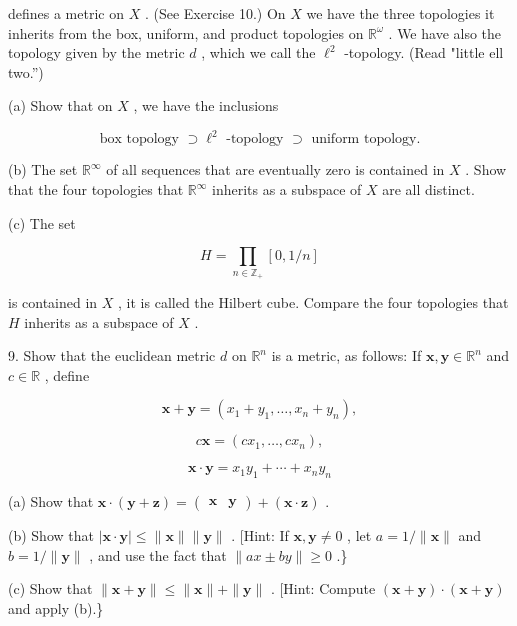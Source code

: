 defines a metric on \(X\) . (See Exercise 10.) On \(X\) we have the three topologies it inherits from the box, uniform, and product topologies on \({\mathbb{R}}^{\omega }\) . We have also the topology given by the metric \(d\) , which we call the \({\ell }^{2}\) -topology. (Read "little ell two.”)

(a) Show that on \(X\) , we have the inclusions

\[
\text{ box topology } \supset  {\ell }^{2}\text{ -topology } \supset  \text{ uniform topology. }
\]

(b) The set \({\mathbb{R}}^{\infty }\) of all sequences that are eventually zero is contained in \(X\) . Show that the four topologies that \({\mathbb{R}}^{\infty }\) inherits as a subspace of \(X\) are all distinct.

(c) The set

\[
H = \mathop{\prod }\limits_{{n \in  {\mathbb{Z}}_{ + }}}\left\lbrack  {0,1/n}\right\rbrack
\]

is contained in \(X\) , it is called the Hilbert cube. Compare the four topologies that \(H\) inherits as a subspace of \(X\) .

9. Show that the euclidean metric \(d\) on \({\mathbb{R}}^{n}\) is a metric, as follows: If \(\mathbf{x},\mathbf{y} \in  {\mathbb{R}}^{n}\) and \(c \in  \mathbb{R}\) , define

\[
\mathbf{x} + \mathbf{y} = \left( {{x}_{1} + {y}_{1},\ldots ,{x}_{n} + {y}_{n}}\right) ,
\]

\[
c\mathbf{x} = \left( {c{x}_{1},\ldots ,c{x}_{n}}\right) ,
\]

\[
\mathbf{x} \cdot  \mathbf{y} = {x}_{1}{y}_{1} + \cdots  + {x}_{n}{y}_{n}
\]

(a) Show that \(\mathbf{x} \cdot  \left( {\mathbf{y} + \mathbf{z}}\right)  = \left( \begin{array}{ll} \mathbf{x} & \mathbf{y} \end{array}\right)  + \left( {\mathbf{x} \cdot  \mathbf{z}}\right)\) .

(b) Show that \(\left| {\mathbf{x} \cdot  \mathbf{y}}\right|  \leq  \parallel \mathbf{x}\parallel \parallel \mathbf{y}\parallel\) . [Hint: If \(\mathbf{x},\mathbf{y} \neq  0\) , let \(a = 1/\parallel \mathbf{x}\parallel\) and \(b = 1/\parallel \mathbf{y}\parallel\) , and use the fact that \(\parallel {ax} \pm  {by}\parallel  \geq  0\) .\}

(c) Show that \(\parallel \mathbf{x} + \mathbf{y}\parallel  \leq  \parallel \mathbf{x}\parallel  + \parallel \mathbf{y}\parallel\) . [Hint: Compute \(\left( {\mathbf{x} + \mathbf{y}}\right)  \cdot  \left( {\mathbf{x} + \mathbf{y}}\right)\) and apply (b).\}

